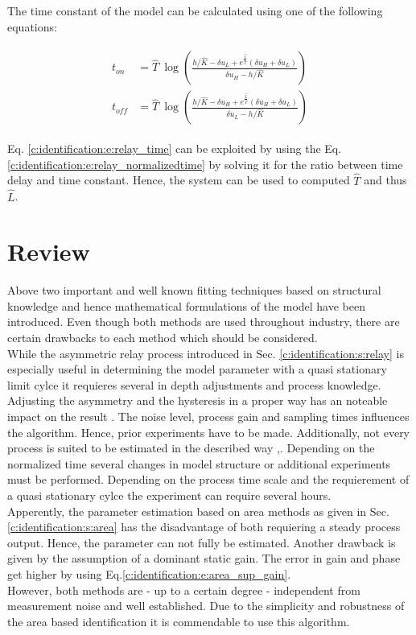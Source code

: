 The time constant of the model can be calculated using one of the following equations:

\begin{align}
\begin{split}
t_{on} &= \hat{T}~ \log\left( \frac{h/\hat{K}-\delta u_L + e^\frac{\hat{L}}{\hat{T}} \left(\delta u_H + \delta u_L \right) }{\delta u_H - h/\hat{K}}\right) \\
t_{off} &= \hat{T}~  \log\left( \frac{h/\hat{K}-\delta u_H + e^\frac{\hat{L}}{\hat{T}} \left(\delta u_H + \delta u_L \right) }{\delta u_L - h/\hat{K}}\right) 
\end{split}
\label{c:identification:e:relay_time}
\end{align}

Eq. \ref{c:identification:e:relay_time} can be exploited by using the Eq. \ref{c:identification:e:relay_normalizedtime} by solving it for the ratio between time delay and time constant. Hence, the system can be used to computed $\hat{T}$ and thus $\hat{L}$. 

\section{Review}
\label{c:identification:s:review}

Above two important and well known fitting techniques based on structural knowledge and hence mathematical formulations of the model have been introduced. Even though both methods are used throughout industry, there are certain drawbacks to each method which should be considered.\\

While the asymmetric relay process introduced in Sec. \ref{c:identification:s:relay} is especially useful in determining the model parameter with a quasi stationary limit cylce it requieres several in depth adjustments and process knowledge. Adjusting the asymmetry and the hysteresis in a proper way has an noteable impact on the result \cite{Berner2016a}. The noise level, process gain and sampling times influences the algorithm. Hence, prior experiments have to be made. Additionally, not every process is suited to be estimated in the described way \cite{Berner2016a},\cite{Berner2015}. Depending on the normalized time several changes in model structure or additional experiments must be performed. Depending on the process time scale and the requierement of a quasi stationary cylce the experiment can require several hours.\\

Apperently, the parameter estimation based on area methods as given in Sec.\ref{c:identification:s:area} has the disadvantage of both requiering a steady process output. Hence, the parameter can not fully be estimated. Another drawback is given by the assumption of a dominant static gain. The error in gain and phase get higher by using Eq.\ref{c:identification:e:area_sup_gain}.\\

However, both methods are - up to a certain degree - independent from measurement noise and well established. Due to the simplicity and robustness of the area based identification it is commendable to use this algorithm. 
